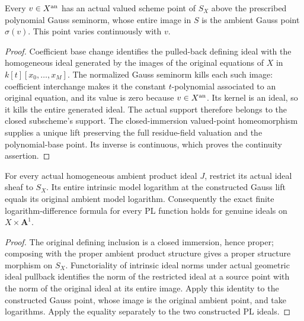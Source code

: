 \begin{lemma}
\label{lem:pl-native-variety-gauss-lift}
\leanok
Every $v\in X^{\rm an}$ has an actual valued scheme point of $S_X$ above
the prescribed polynomial Gauss seminorm, whose entire image in $S$ is
the ambient Gauss point $\sigma(v)$.  This point varies continuously with
$v$.
\end{lemma}
\begin{proof}
Coefficient base change identifies the pulled-back defining ideal with
the homogeneous ideal generated by the images of the original equations
of $X$ in $k[t][x_0,\ldots,x_M]$.  The normalized Gauss seminorm kills
each such image: coefficient interchange makes it the constant
$t$-polynomial associated to an original equation, and its value is zero
because $v\in X^{\rm an}$.  Its kernel is an ideal, so it kills the
entire generated ideal.  The actual support therefore belongs to the
closed subscheme's support.  The closed-immersion valued-point
homeomorphism supplies a unique lift preserving the full residue-field
valuation and the polynomial-base point.  Its inverse is continuous,
which proves the continuity assertion.
\end{proof}

\begin{lemma}
\label{lem:pl-native-variety-ideal-log}
\leanok
For every actual homogeneous ambient product ideal $J$, restrict its
actual ideal sheaf to $S_X$.  Its entire intrinsic model logarithm at the
constructed Gauss lift equals its original ambient model logarithm.
Consequently the exact finite logarithm-difference formula for every PL
function holds for genuine ideals on $X\times\mathbf A^1$.
\end{lemma}
\begin{proof}
The original defining inclusion is a closed immersion, hence proper;
composing with the proper ambient product structure gives a proper
structure morphism on $S_X$.  Functoriality of intrinsic ideal norms
under actual geometric ideal pullback identifies the norm of the
restricted ideal at a source point with the norm of the original ideal
at its entire image.  Apply this identity to the constructed Gauss
point, whose image is the original ambient point, and take logarithms.
Apply the equality separately to the two constructed PL ideals.
\end{proof}
